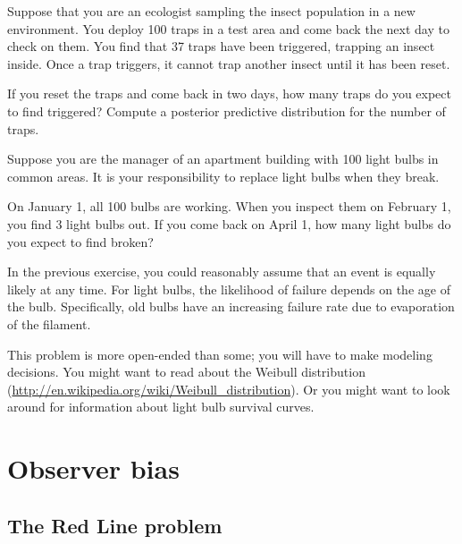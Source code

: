 \documentclass[12pt]{book}
\begin{document}
\begin{exercise}

Suppose that you are an ecologist sampling the insect population in
a new environment.  You deploy 100 traps in a test area and come back
the next day to check on them.  You find that 37 traps have been
triggered, trapping an insect inside.  Once a trap triggers, it
cannot trap another insect until it has been reset.

If you reset the traps and come back in two days, how many traps
do you expect to find triggered?  Compute a posterior predictive
distribution for the number of traps.

\end{exercise}


\begin{exercise}

Suppose you are the manager of an apartment building with
100 light bulbs in common areas.  It is your responsibility
to replace light bulbs when they break.

On January 1, all 100 bulbs are working.  When you inspect
them on February 1, you find 3 light bulbs out.  If you
come back on April 1, how many light bulbs do you expect to
find broken?

In the previous exercise, you could reasonably assume that an event is
equally likely at any time.  For light bulbs, the likelihood of
failure depends on the age of the bulb.  Specifically, old bulbs
have an increasing failure rate due to evaporation of the filament.

This problem is more open-ended than some; you will have to make
modeling decisions.  You might want to read about the Weibull
distribution
(\url{http://en.wikipedia.org/wiki/Weibull_distribution}).
Or you might want to look around for information about
light bulb survival curves.

\end{exercise}


\chapter{Observer bias}
\label{observer}

\section{The Red Line problem}
\end{document}

